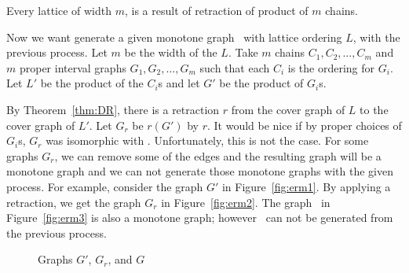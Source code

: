 \begin{cor}
Every lattice of width \(m\), is a result of retraction of product of
\(m\) chains.
\end{cor}

Now we want generate a given monotone graph \mG\ with lattice ordering \(L\),
with the previous process. Let \(m\) be the width of the \(L\)\@.
Take \(m\) chains \(C_1,C_2,\dotsc,C_m\) and \(m\) proper interval graphs
\(G_1,G_2,\dotsc,G_m\) such that each \(C_i\) is the ordering for
\(G_i\)\@.
Let \(L'\) be the product of the \(C_i\)s and let \(G'\)
be the product of \(G_i\)s.

By Theorem~\ref{thm:DR}, there is a retraction \(r\) from the
cover graph of \(L\) to the cover graph of \(L'\)\@.
Let \(G_r\) be \(r(G')\) by \(r\)\@.
It would be nice if by proper choices of \(G_i\)s, \(G_r\)
was isomorphic with \mG\@. Unfortunately, this is not the case.
For some graphs \(G_r\), we can remove some of the edges and
the resulting graph will be a monotone graph and we can not generate those monotone
graphs with the given process. For example, consider the graph \(G'\) in
Figure~\ref{fig:erm1}\@. By applying a retraction, we get the
graph \(G_r\) in Figure~\ref{fig:erm2}\@. The graph
\mG\ in Figure~\ref{fig:erm3} is also a monotone graph; however
\mG\ can not be generated from the previous process\@.

\begin{figure}
\hfill
\subfigure[\ensuremath{G'}]{\label{fig:erm1}}\hfill 
\subfigure[\ensuremath{G_r}]{\label{fig:erm2}}\hfill 
\subfigure[\ensuremath{G}]{\label{fig:erm3}}\hfill 
\caption{Graphs \ensuremath{G'}, \ensuremath{G_r}, and \ensuremath{G}}
\end{figure}
